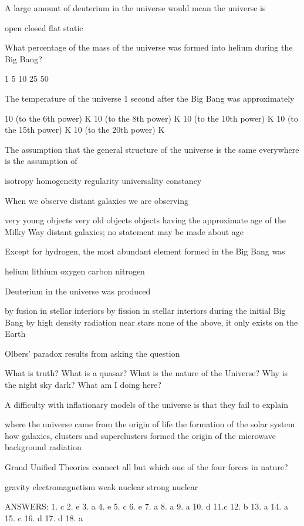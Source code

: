 A large amount of deuterium in the universe would mean the universe is

    open
    closed
    flat
    static

What percentage of the mass of the universe was formed into helium during the Big Bang?

    1%
    5%
    10%
    25%
    50%

The temperature of the universe 1 second after the Big Bang was approximately

    10 (to the 6th power) K
    10 (to the 8th power) K
    10 (to the 10th power) K
    10 (to the 15th power) K
    10 (to the 20th power) K

The assumption that the general structure of the universe is the same everywhere is the assumption of

    isotropy
    homogeneity
    regularity
    universality
    constancy

When we observe distant galaxies we are observing

    very young objects
    very old objects
    objects having the approximate age of the Milky Way
    distant galaxies; no statement may be made about age

Except for hydrogen, the most abundant element formed in the Big Bang was

    helium
    lithium
    oxygen
    carbon
    nitrogen

Deuterium in the universe was produced

    by fusion in stellar interiors
    by fission in stellar interiors
    during the initial Big Bang
    by high density radiation near stars
    none of the above, it only exists on the Earth

Olbers’ paradox results from asking the question

    What is truth?
    What is a quasar?
    What is the nature of the Universe?
    Why is the night sky dark?
    What am I doing here?

A difficulty with inflationary models of the universe is that they fail to explain

    where the universe came from
    the origin of life
    the formation of the solar system
    how galaxies, clusters and superclusters formed
    the origin of the microwave background radiation

Grand Unified Theories connect all but which one of the four forces in nature?

    gravity
    electromagnetism
    weak nuclear
    strong nuclear
 
 
 
 
ANSWERS:
1.  c
2.  e
3.  a
4.  e
5.  c
6.  e
7.  a
8.  a
9.  a
10. d
11.c
12. b
13. a
14. a
15. c
16. d
17. d
18. a


